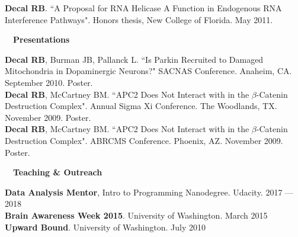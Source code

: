 \documentclass[a4paper,12pt]{article}
\newcommand{\resheading}[1]{{\hspace{-9pt} \colorbox{mygrey}{\begin{minipage}{\textwidth}{\textmd{~~\large \textbf{#1} \vphantom{p\^{E}}}}\end{minipage}}\vspace{6pt}} }
\begin{document}
    \textbf{Decal RB}. ``A Proposal for RNA Helicase A Function in Endogenous RNA Interference Pathways". Honors thesis, New College of Florida. May 2011.\\%


    \resheading{Presentations}


    \textbf{Decal RB}, Burman JB, Pallanck L. ``Is Parkin Recruited to Damaged Mitochondria in Dopaminergic Neurons?" SACNAS Conference. Anaheim, CA. September 2010. Poster.\\

    \textbf{Decal RB}, McCartney BM. ``APC2 Does Not Interact with in the $\beta$-Catenin Destruction Complex". Annual Sigma Xi Conference. The Woodlands, TX. November 2009. Poster.\\

    \textbf{Decal RB}, McCartney BM. ``APC2 Does Not Interact with in the $\beta$-Catenin Destruction Complex". ABRCMS Conference. Phoenix, AZ. November 2009. Poster.\\

    \resheading{Teaching \& Outreach}


    \textbf{Data Analysis Mentor}, Intro to Programming Nanodegree. Udacity. \hfill 2017 --- 2018\\

    \textbf{Brain Awareness Week 2015}. University of Washington. \hfill  March 2015\\

    \textbf{Upward Bound}. University of Washington. \hfill  July 2010\\



\end{document}
